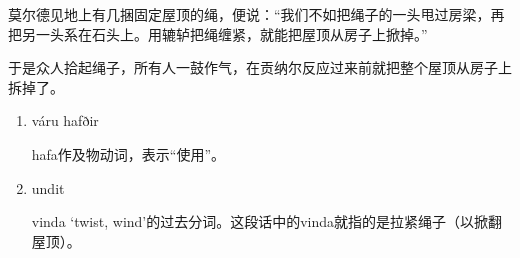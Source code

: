 \begin{translation*}{}
  莫尔德见地上有几捆固定屋顶的绳，便说：“我们不如把绳子的一头甩过房梁，再把另一头系在石头上。用辘轳把绳缠紧，就能把屋顶从房子上掀掉。”

  于是众人拾起绳子，所有人一鼓作气，在贡纳尔反应过来前就把整个屋顶从房子上拆掉了。
\end{translation*}
\begin{grammar*}{}
  \begin{enumerate}[leftmargin=*]
    \item váru hafðir

          hafa作及物动词，表示“使用”。
    \item undit

          vinda `twist, wind'的过去分词。这段话中的vinda就指的是拉紧绳子（以掀翻屋顶）。
  \end{enumerate}
\end{grammar*}

